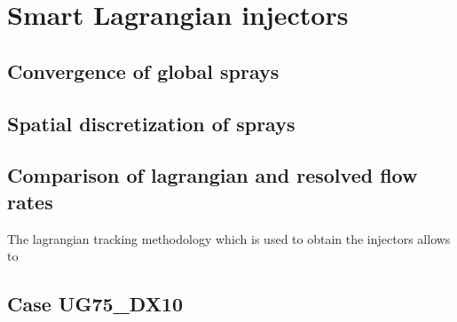 \section{Smart Lagrangian injectors}
\label{sec:ch5_learning_SLI}

\subsection{Convergence of global sprays}


\subsection{Spatial discretization of sprays}

\subsection{Comparison of lagrangian and resolved flow rates}

The lagrangian tracking methodology which is used to obtain the injectors allows to 

\clearpage

\subsection*{Case UG75\_DX10}





